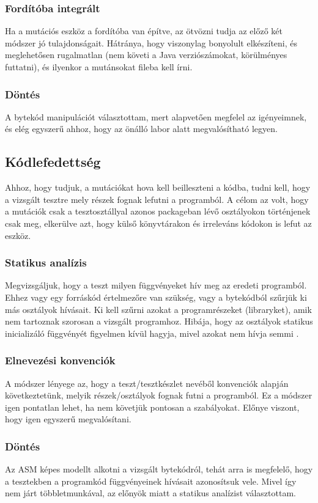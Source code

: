 \subsubsection{Fordítóba integrált}
Ha a mutációs eszköz a fordítóba van építve, az ötvözni tudja az előző két módszer jó tulajdonságait. Hátránya, hogy viszonylag bonyolult elkészíteni, és meglehetősen rugalmatlan (nem követi a Java verziószámokat, körülményes futtatni), és ilyenkor a mutánsokat fileba kell írni.
\subsubsection{Döntés}
A bytekód manipulációt választottam, mert alapvetően megfelel az igényeimnek, és elég egyszerű ahhoz, hogy az önálló labor alatt megvalósítható legyen.
\subsection{Kódlefedettség}
Ahhoz, hogy tudjuk, a mutációkat hova kell beilleszteni a kódba, tudni kell, hogy a vizsgált tesztre mely részek fognak lefutni a programból. A célom az volt, hogy a mutációk csak a tesztosztállyal azonos packageban lévő osztályokon történjenek csak meg, elkerülve azt, hogy külső könyvtárakon és irreleváns kódokon is lefut az eszköz.
\subsubsection{Statikus analízis}
Megvizsgáljuk, hogy a teszt milyen függvényeket hív meg az eredeti programból. Ehhez vagy egy forráskód értelmezőre van szükség, vagy a bytekódból szűrjük ki más osztályok hívásait. Ki kell szűrni azokat a programrészeket (libraryket), amik nem tartoznak szorosan a vizsgált programhoz. Hibája, hogy az osztályok statikus inicializáló függvényét figyelmen kívül hagyja, mivel azokat nem hívja semmi \cite{so_you_want_to} .
\subsubsection{Elnevezési konvenciók}
A módszer lényege az, hogy a teszt/tesztkészlet nevéből konvenciók alapján következtetünk, melyik részek/osztályok fognak futni a programból. Ez a módszer igen pontatlan lehet, ha nem követjük pontosan a szabályokat. Előnye viszont, hogy igen egyszerű megvalósítani.
\subsubsection{Döntés}
Az ASM képes modellt alkotni a vizsgált bytekódról, tehát arra is megfelelő, hogy a tesztekben a programkód függvényeinek hívásait azonosítsuk vele. Mivel így nem járt többletmunkával, az előnyök miatt a statikus analízist választottam.

